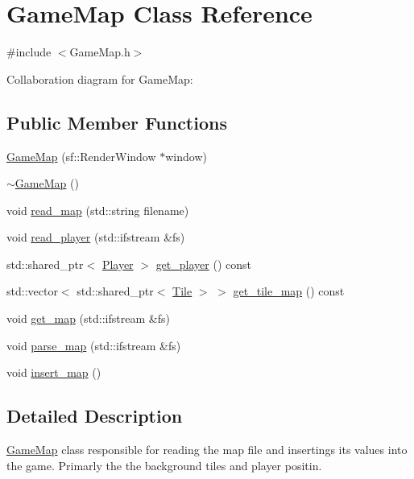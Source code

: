 \hypertarget{classGameMap}{}\section{Game\+Map Class Reference}
\label{classGameMap}


{\ttfamily \#include $<$Game\+Map.\+h$>$}



Collaboration diagram for Game\+Map\+:
\subsection*{Public Member Functions}
\begin{DoxyCompactItemize}
\item 
\hyperlink{classGameMap_a88dc5aa1e8189e1f00570f898df55ec4}{Game\+Map} (sf\+::\+Render\+Window $\ast$window)
\item 
\hyperlink{classGameMap_a85d51ef20c2d27f11c739ff02d5717c3}{$\sim$\+Game\+Map} ()
\item 
void \hyperlink{classGameMap_a6ae8d5ab0680b562a8807049cd52c52d}{read\+\_\+map} (std\+::string filename)
\item 
void \hyperlink{classGameMap_a51eeccf4c1f0edac69dbd2a4d3a5e9e7}{read\+\_\+player} (std\+::ifstream \&fs)
\item 
std\+::shared\+\_\+ptr$<$ \hyperlink{classPlayer}{Player} $>$ \hyperlink{classGameMap_ada35cb948e4465b29086a6ad4932f6ce}{get\+\_\+player} () const
\item 
std\+::vector$<$ std\+::shared\+\_\+ptr$<$ \hyperlink{classTile}{Tile} $>$ $>$ \hyperlink{classGameMap_affb1e1429ba687d7a62c5ea4e867c803}{get\+\_\+tile\+\_\+map} () const
\item 
void \hyperlink{classGameMap_ad78024143664c693fb1ae160c835566d}{get\+\_\+map} (std\+::ifstream \&fs)
\item 
void \hyperlink{classGameMap_a7b2b1eb1706633e48197679314a0f912}{parse\+\_\+map} (std\+::ifstream \&fs)
\item 
void \hyperlink{classGameMap_a9d53ff53fb0a9514620459b61fe3c2a2}{insert\+\_\+map} ()
\end{DoxyCompactItemize}


\subsection{Detailed Description}
\hyperlink{classGameMap}{Game\+Map} class responsible for reading the map file and insertings it\textquotesingle{}s values into the game. Primarly the the background tiles and player positin. 


